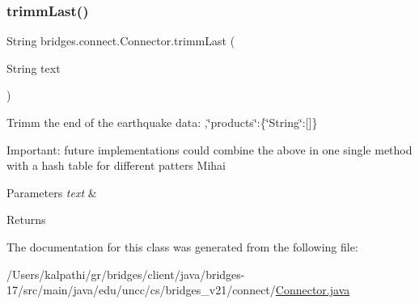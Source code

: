 \subsubsection{\texorpdfstring{trimm\+Last()}{trimmLast()}}
{\footnotesize\ttfamily String bridges.\+connect.\+Connector.\+trimm\+Last (\begin{DoxyParamCaption}\item[{String}]{text }\end{DoxyParamCaption})}

Trimm the end of the earthquake data\+: ,\char`\"{}products\char`\"{}\+:\{\char`\"{}\+String\char`\"{}\+:\mbox{[}\mbox{]}\}

Important\+: future implementations could combine the above in one single method with a hash table for different patters Mihai 
\begin{DoxyParams}{Parameters}
{\em text} & \\
\hline
\end{DoxyParams}
\begin{DoxyReturn}{Returns}

\end{DoxyReturn}


The documentation for this class was generated from the following file\+:\begin{DoxyCompactItemize}
\item 
/\+Users/kalpathi/gr/bridges/client/java/bridges-\/17/src/main/java/edu/uncc/cs/bridges\+\_\+v21/connect/\mbox{\hyperlink{_connector_8java}{Connector.\+java}}\end{DoxyCompactItemize}
